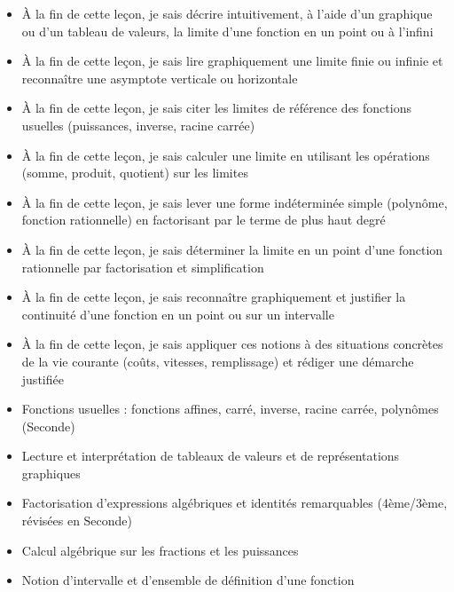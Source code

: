 \documentclass[11pt]{article}
\begin{document}
\begin{objectifs}
\begin{itemize}
\item À la fin de cette leçon, je sais décrire intuitivement, à l'aide d'un graphique ou d'un tableau de valeurs, la limite d'une fonction en un point ou à l'infini
\item À la fin de cette leçon, je sais lire graphiquement une limite finie ou infinie et reconnaître une asymptote verticale ou horizontale
\item À la fin de cette leçon, je sais citer les limites de référence des fonctions usuelles (puissances, inverse, racine carrée)
\item À la fin de cette leçon, je sais calculer une limite en utilisant les opérations (somme, produit, quotient) sur les limites
\item À la fin de cette leçon, je sais lever une forme indéterminée simple (polynôme, fonction rationnelle) en factorisant par le terme de plus haut degré
\item À la fin de cette leçon, je sais déterminer la limite en un point d'une fonction rationnelle par factorisation et simplification
\item À la fin de cette leçon, je sais reconnaître graphiquement et justifier la continuité d'une fonction en un point ou sur un intervalle
\item À la fin de cette leçon, je sais appliquer ces notions à des situations concrètes de la vie courante (coûts, vitesses, remplissage) et rédiger une démarche justifiée
\end{itemize}
\end{objectifs}

\begin{prerequis}
\begin{itemize}
\item Fonctions usuelles : fonctions affines, carré, inverse, racine carrée, polynômes (Seconde)
\item Lecture et interprétation de tableaux de valeurs et de représentations graphiques
\item Factorisation d'expressions algébriques et identités remarquables (4ème/3ème, révisées en Seconde)
\item Calcul algébrique sur les fractions et les puissances
\item Notion d'intervalle et d'ensemble de définition d'une fonction
\end{itemize}
\end{prerequis}
\end{document}
